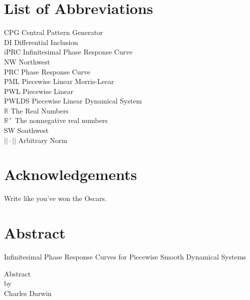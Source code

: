 \documentclass[12pt]{article}
\begin{document}
\section*{List of Abbreviations}
CPG Central Pattern Generator\\
DI Differential Inclusion\\
iPRC Infinitesimal Phase Response Curve\\
NW Northwest\\
PRC Phase Response Curve\\
PML Piecewise Linear Morris-Lecar\\
PWL Piecewise Linear\\
PWLDS Piecewise Linear Dynamical System\\
$\mathbb{R}$ The Real Numbers\\
$\mathbb{R}^+$ The nonnegative real numbers\\
SW Southwest\\
$||\cdot||$ Arbitrary Norm\\
\newpage

\section*{Acknowledgements}
Write like you've won the Oscars.
\newpage




\section*{Abstract}
\begin{center}
 Infinitesimal Phase Response Curves for Piecewise Smooth Dynamical Systems\\
 \vspace{.5in}
 
 Abstract\\
 
 by\\
 
 Charles Darwin
\end{center}
\end{document}
